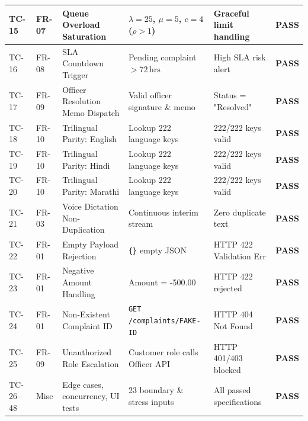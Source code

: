 \begin{table}[p]
\begin{tabular}{|p{1.2cm}|p{1.2cm}|p{3.8cm}|p{3.8cm}|p{2.8cm}|p{1.0cm}|}
TC-15 & FR-07 & Queue Overload Saturation & $\lambda=25$, $\mu=5$, $c=4$ ($\rho > 1$) & Graceful limit handling & \textbf{PASS} \\ \hline
TC-16 & FR-08 & SLA Countdown Trigger & Pending complaint $> 72\,\text{hrs}$ & High SLA risk alert & \textbf{PASS} \\ \hline
TC-17 & FR-09 & Officer Resolution Memo Dispatch & Valid officer signature \& memo & Status = "Resolved" & \textbf{PASS} \\ \hline
TC-18 & FR-10 & Trilingual Parity: English & Lookup 222 language keys & 222/222 keys valid & \textbf{PASS} \\ \hline
TC-19 & FR-10 & Trilingual Parity: Hindi & Lookup 222 language keys & 222/222 keys valid & \textbf{PASS} \\ \hline
TC-20 & FR-10 & Trilingual Parity: Marathi & Lookup 222 language keys & 222/222 keys valid & \textbf{PASS} \\ \hline
TC-21 & FR-03 & Voice Dictation Non-Duplication & Continuous interim stream & Zero duplicate text & \textbf{PASS} \\ \hline
TC-22 & FR-01 & Empty Payload Rejection & \texttt{\{\}} empty JSON & HTTP 422 Validation Err & \textbf{PASS} \\ \hline
TC-23 & FR-01 & Negative Amount Handling & Amount = -500.00 & HTTP 422 rejected & \textbf{PASS} \\ \hline
TC-24 & FR-01 & Non-Existent Complaint ID & \texttt{GET /complaints/FAKE-ID} & HTTP 404 Not Found & \textbf{PASS} \\ \hline
TC-25 & FR-09 & Unauthorized Role Escalation & Customer role calls Officer API & HTTP 401/403 blocked & \textbf{PASS} \\ \hline
TC-26--48 & Misc & Edge cases, concurrency, UI tests & 23 boundary \& stress inputs & All passed specifications & \textbf{PASS} \\ \hline
\end{tabular}
\end{table}

